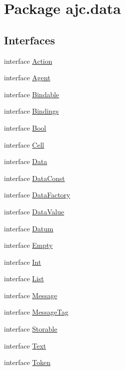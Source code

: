 \hypertarget{package__ajc_8data}{
\section{Package ajc.data}
\label{package__ajc_8data}
}
\subsection*{Interfaces}
\begin{CompactItemize}
\item 
interface \hyperlink{interfaceAction}{Action}
\item 
interface \hyperlink{interfaceAgent}{Agent}
\item 
interface \hyperlink{interfaceBindable}{Bindable}
\item 
interface \hyperlink{interfaceBindings}{Bindings}
\item 
interface \hyperlink{interfaceBool}{Bool}
\item 
interface \hyperlink{interfaceCell}{Cell}
\item 
interface \hyperlink{interfaceData}{Data}
\item 
interface \hyperlink{interfaceDataConst}{Data\-Const}
\item 
interface \hyperlink{interfaceDataFactory}{Data\-Factory}
\item 
interface \hyperlink{interfaceDataValue}{Data\-Value}
\item 
interface \hyperlink{interfaceDatum}{Datum}
\item 
interface \hyperlink{interfaceEmpty}{Empty}
\item 
interface \hyperlink{interfaceInt}{Int}
\item 
interface \hyperlink{interfaceList}{List}
\item 
interface \hyperlink{interfaceMessage}{Message}
\item 
interface \hyperlink{interfaceMessageTag}{Message\-Tag}
\item 
interface \hyperlink{interfaceStorable}{Storable}
\item 
interface \hyperlink{interfaceText}{Text}
\item 
interface \hyperlink{interfaceToken}{Token}
\end{CompactItemize}
